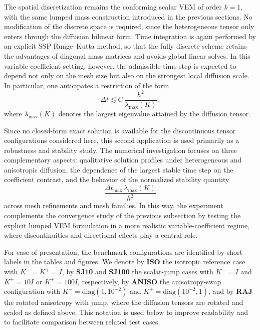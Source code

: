 \documentclass{article}
\begin{document}
The spatial discretization remains the conforming scalar VEM of order $k=1$, with the same lumped mass construction introduced in the previous sections. No modification of the discrete space is required, since the heterogeneous tensor only enters through the diffusion bilinear form. Time integration is again performed by an explicit SSP Runge--Kutta method, so that the fully discrete scheme retains the advantages of diagonal mass matrices and avoids global linear solves. In this variable-coefficient setting, however, the admissible time step is expected to depend not only on the mesh size but also on the strongest local diffusion scale. In particular, one anticipates a restriction of the form
\begin{equation}
    \nonumber
    \Delta t \lesssim C \,\frac{h^2}{\lambda_{\max}(K)},
\end{equation}
where $\lambda_{\max}(K)$ denotes the largest eigenvalue attained by the diffusion tensor.

Since no closed-form exact solution is available for the discontinuous tensor configurations considered here, this second application is used primarily as a robustness and stability study. The numerical investigation focuses on three complementary aspects: qualitative solution profiles under heterogeneous and anisotropic diffusion, the dependence of the largest stable time step on the coefficient contrast, and the behavior of the normalized stability quantity
\begin{equation}
    \nonumber
    \frac{\Delta t_{\max}\,\lambda_{\max}(K)}{h^2}
\end{equation}
across mesh refinements and mesh families. In this way, the experiment complements the convergence study of the previous subsection by testing the explicit lumped VEM formulation in a more realistic variable-coefficient regime, where discontinuities and directional effects play a central role.

For ease of presentation, the benchmark configurations are identified by short labels in the tables and figures. We denote by \textbf{ISO} the isotropic reference case with $K^{-}=K^{+}=I$, by \textbf{SJ10} and \textbf{SJ100} the scalar-jump cases with $K^{-}=I$ and $K^{+}=10I$ or $K^{+}=100I$, respectively, by \textbf{ANISO} the anisotropy-swap configuration with $K^{-}=\mathrm{diag}(1,10^{-2})$ and $K^{+}=\mathrm{diag}(10^{-2},1)$, and by \textbf{RAJ} the rotated anisotropy with jump, where the diffusion tensors are rotated and scaled as defined above. This notation is used below to improve readability and to facilitate comparison between related test cases.
\end{document}
